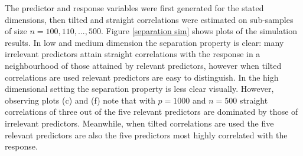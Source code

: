 \documentclass[11pt]{report}\usepackage[utf8]{inputenc}
\begin{document}
The predictor and response variables were first generated for the stated dimensions, then tilted and straight correlations were estimated on sub-samples of size $n = 100, 110, ..., 500$. Figure \ref{separation sim} shows plots of the simulation results. In low and medium dimension the separation property is clear: many irrelevant predictors attain straight correlations with the response in a neighbourhood of those attained by relevant predictors, however when tilted correlations are used relevant predictors are easy to distinguish. In the high dimensional setting the separation property is less clear visually. However, observing plots (c) and (f) note that with $p=1000$ and $n = 500$ straight correlations of three out of the five relevant predictors are dominated by those of irrelevant predictors. Meanwhile, when tilted correlations are used the five relevant predictors are also the five predictors most highly correlated with the response. 
\end{document}
